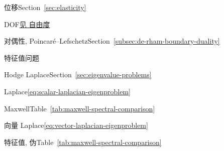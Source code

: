 \par\noindent\hspace*{0em}\label{index:displacement}{位移}\quad Section~\ref{sec:elasticity}

\par\noindent\hspace*{0em}\label{index:dof}{DOF}\quad \hyperref[index:degree-of-freedom-dof]{{见 自由度}}

\par\noindent\hspace*{0em}\label{index:duality-poincar-lefschetz}{对偶性, Poincaré–Lefschetz}\quad Section~\ref{subsec:de-rham-boundary-duality}

\par\noindent\hspace*{0em}\label{index:eigenvalue-problem}{特征值问题}

\par\noindent\hspace*{1em}\label{index:eigenvalue-problem-hodge-laplace}{Hodge Laplace}\quad Section~\ref{sec:eigenvalue-problems}

\par\noindent\hspace*{1em}\label{index:eigenvalue-problem-laplace}{Laplace}\quad \eqref{eq:scalar-laplacian-eigenproblem}

\par\noindent\hspace*{1em}\label{index:eigenvalue-problem-maxwell}{Maxwell}\quad Table~\ref{tab:maxwell-spectral-comparison}

\par\noindent\hspace*{1em}\label{index:eigenvalue-problem-vector-laplace}{向量 Laplace}\quad \eqref{eq:vector-laplacian-eigenproblem}

\par\noindent\hspace*{0em}\label{index:eigenvalue-spurious}{特征值, 伪}\quad Table~\ref{tab:maxwell-spectral-comparison}

